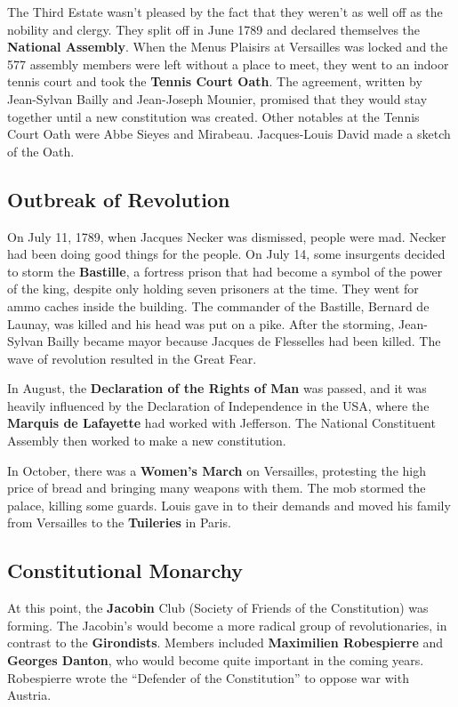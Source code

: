 The Third Estate wasn't pleased by the fact that they weren't as well off as the nobility and clergy.
They split off in June 1789 and declared themselves the \textbf{National Assembly}.
When the Menus Plaisirs at Versailles was locked and the 577 assembly members were left without a place to meet,
they went to an indoor tennis court and took the \textbf{Tennis Court Oath}.
The agreement, written by Jean-Sylvan Bailly and Jean-Joseph Mounier,
promised that they would stay together until a new constitution was created.
Other notables at the Tennis Court Oath were Abbe Sieyes and Mirabeau.
Jacques-Louis David made a sketch of the Oath.

\subsection*{Outbreak of Revolution}

On July 11, 1789, when Jacques Necker was dismissed, people were mad.
Necker had been doing good things for the people.
On July 14, some insurgents decided to storm the \textbf{Bastille},
a fortress prison that had become a symbol of the power of the king,
despite only holding seven prisoners at the time.
They went for ammo caches inside the building.
The commander of the Bastille, Bernard de Launay, was killed and his head was put on a pike.
After the storming, Jean-Sylvan Bailly became mayor because Jacques de Flesselles had been killed.
The wave of revolution resulted in the Great Fear.

In August, the \textbf{Declaration of the Rights of Man} was passed,
and it was heavily influenced by the Declaration of Independence in the USA,
where the \textbf{Marquis de Lafayette} had worked with Jefferson.
The National Constituent Assembly then worked to make a new constitution.

In October, there was a \textbf{Women's March} on Versailles,
protesting the high price of bread and bringing many weapons with them.
The mob stormed the palace, killing some guards.
Louis gave in to their demands and moved his family from Versailles to the \textbf{Tuileries} in Paris.

\subsection*{Constitutional Monarchy}

At this point, the \textbf{Jacobin} Club (Society of Friends of the Constitution) was forming.
The Jacobin's would become a more radical group of revolutionaries, in contrast to the \textbf{Girondists}.
Members included \textbf{Maximilien Robespierre} and \textbf{Georges Danton},
who would become quite important in the coming years.
Robespierre wrote the ``Defender of the Constitution'' to oppose war with Austria.


